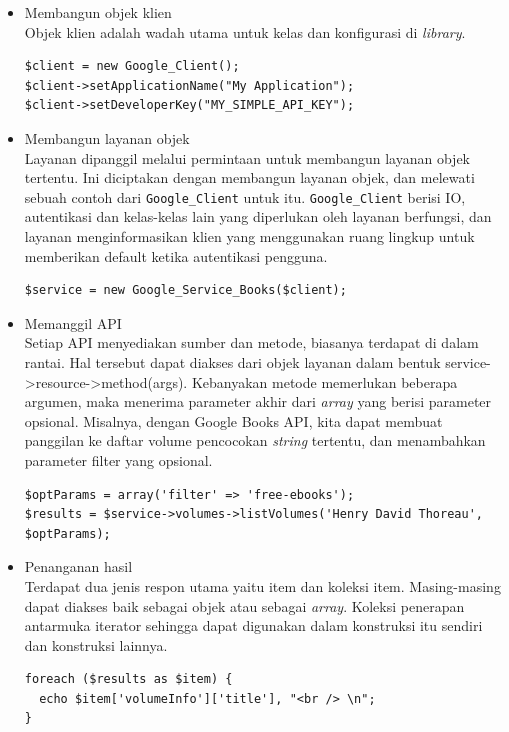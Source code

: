 \begin{itemize}
\item Membangun objek klien \\
Objek klien adalah wadah utama untuk kelas dan konfigurasi di {\it library}.
\begin{lstlisting}[basicstyle=\footnotesize]
$client = new Google_Client();
$client->setApplicationName("My Application");
$client->setDeveloperKey("MY_SIMPLE_API_KEY");
\end{lstlisting}

\item Membangun layanan objek\\
Layanan dipanggil melalui permintaan untuk membangun layanan objek tertentu. Ini diciptakan dengan membangun layanan objek, dan melewati sebuah contoh dari \verb+Google_Client+ untuk itu. \verb+Google_Client+ berisi IO, autentikasi dan kelas-kelas lain yang diperlukan oleh layanan berfungsi, dan layanan menginformasikan klien yang menggunakan ruang lingkup untuk memberikan default ketika autentikasi pengguna.
\begin{lstlisting}[basicstyle=\footnotesize]
$service = new Google_Service_Books($client);
\end{lstlisting}

\item Memanggil API\\
Setiap API menyediakan sumber dan metode, biasanya terdapat di dalam rantai. Hal tersebut dapat diakses dari objek layanan dalam bentuk {\textdollar}service->resource->method(args). Kebanyakan metode memerlukan beberapa argumen, maka menerima parameter akhir dari {\it array} yang berisi parameter opsional. Misalnya, dengan Google Books API, kita dapat membuat panggilan ke daftar volume pencocokan {\it string} tertentu, dan menambahkan parameter filter yang opsional.
\begin{lstlisting}[basicstyle=\footnotesize]
$optParams = array('filter' => 'free-ebooks');
$results = $service->volumes->listVolumes('Henry David Thoreau', $optParams);
\end{lstlisting}

\item Penanganan hasil\\
Terdapat dua jenis respon utama yaitu item dan koleksi item. Masing-masing dapat diakses baik sebagai objek atau sebagai {\it array}. Koleksi penerapan antarmuka iterator sehingga dapat digunakan dalam konstruksi itu sendiri dan konstruksi lainnya.
\begin{lstlisting}[basicstyle=\footnotesize]
foreach ($results as $item) {
  echo $item['volumeInfo']['title'], "<br /> \n";
}
\end{lstlisting}
\end{itemize}

